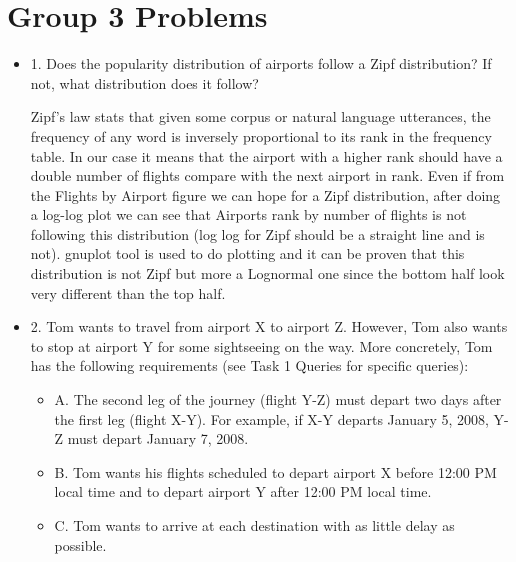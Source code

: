 \documentclass[fontsize=11pt,paper=a4,pagesize=auto]{report}
\begin{document}
\section{Group 3 Problems}
\begin{itemize}
\item 1. Does the popularity distribution of airports follow a Zipf distribution? If not, what distribution does it follow?

Zipf’s law stats that given some corpus or natural language utterances, the frequency of any word is inversely proportional to its rank in the frequency table. In our case it means that the airport with a higher rank should have a double number of flights compare with the next airport in rank. Even if from the Flights by Airport figure we can hope for a Zipf distribution, after
doing a log-log plot we can see that Airports rank by number of flights is not following this distribution (log log for Zipf should be a straight line and is not). gnuplot tool is used to do plotting and it can be proven that this distribution is not Zipf but more a Lognormal one since the bottom half look very different than the top half. 



\item 2. Tom wants to travel from airport X to airport Z. However, Tom also wants to stop at airport Y for some sightseeing on the way. More concretely, Tom has the following requirements (see Task 1 Queries for specific queries):
\begin{itemize}
\item A. The second leg of the journey (flight Y-Z) must depart two days after the first leg (flight X-Y). For example, if X-Y departs January 5, 2008, Y-Z must depart January 7, 2008.
\item B. Tom wants his flights scheduled to depart airport X before 12:00 PM local time and to depart airport Y after 12:00 PM local time.
\item C. Tom wants to arrive at each destination with as little delay as possible.
\end{itemize}
\end{itemize}
\end{document}
